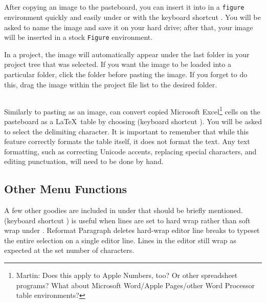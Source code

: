 \subsection[Paste as Image]{}
\label{reference.edit.pasteimg}
After copying an image to the pasteboard, you can insert it into \texnicle in a \verb|figure| environment quickly and easily under  or with the keyboard shortcut . You will be asked to name the image and save it on your hard drive; after that, your image will be inserted in a stock \verb|Figure| environment.

In a project, the image will automatically appear under the last folder in your project tree that was selected. If you want the image to be loaded into a particular folder, click the folder before pasting the image. If you forget to do this, drag the image within the project file list to the desired folder.

\subsection[Paste as Table]{}
\label{reference.edit.pastetab}
Similarly to pasting as an image, \texnicle can convert copied Microsoft Excel\footnote{Martin: Does this apply to Apple Numbers, too? Or other spreadsheet programs? What about Microsoft Word/Apple Pages/other Word Processor table environments?} cells on the pasteboard as a \LaTeX\ table by choosing  (keyboard shortcut ). You will be asked to select the delimiting character. It is important to remember that while this feature correctly formats the table itself, it does not format the text. Any text formatting, such as correcting Unicode accents, replacing special characters, and editing punctuation, will need to be done by hand.


\subsection[Other Edit Menu Functions]{Other  Menu Functions}
\label{reference.edit.other}
A few other goodies are included in under  that should be briefly mentioned.  (keyboard shortcut ) is useful when lines are set to hard wrap rather than soft wrap under . Reformat Paragraph deletes hard-wrap editor line breaks to typeset the entire selection on a single editor line. Lines in the editor still wrap as expected at the set number of characters.

